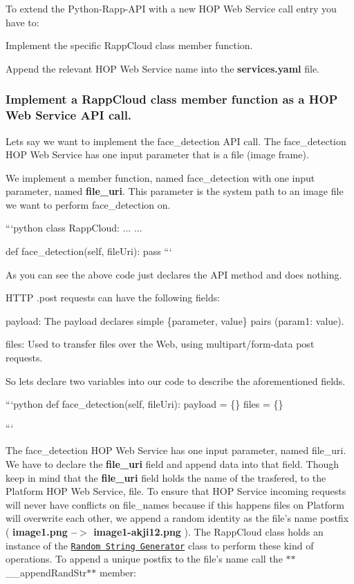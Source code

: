To extend the Python-\/\-Rapp-\/\-A\-P\-I with a new H\-O\-P Web Service call entry you have to\-:


\begin{DoxyItemize}
\item Implement the specific Rapp\-Cloud class member function.
\item Append the relevant H\-O\-P Web Service name into the {\bfseries services.\-yaml} file.
\end{DoxyItemize}

\subsubsection*{Implement a Rapp\-Cloud class member function as a H\-O\-P Web Service A\-P\-I call.}

Lets say we want to implement the face\-\_\-detection A\-P\-I call. The face\-\_\-detection H\-O\-P Web Service has one input parameter that is a file (image frame).

We implement a member function, named face\-\_\-detection with one input parameter, named {\bfseries file\-\_\-uri}. This parameter is the system path to an image file we want to perform face\-\_\-detection on.

```python class Rapp\-Cloud\-: ... ...

def face\-\_\-detection(self, file\-Uri)\-: pass ```

As you can see the above code just declares the A\-P\-I method and does nothing.

H\-T\-T\-P .post requests can have the following fields\-:


\begin{DoxyItemize}
\item payload\-: The payload declares simple \{parameter, value\} pairs (param1\-: value).
\item files\-: Used to transfer files over the Web, using multipart/form-\/data post requests.
\end{DoxyItemize}

So lets declare two variables into our code to describe the aforementioned fields.

```python def face\-\_\-detection(self, file\-Uri)\-: payload = \{\} files = \{\}

```

The face\-\_\-detection H\-O\-P Web Service has one input parameter, named file\-\_\-uri. We have to declare the {\bfseries file\-\_\-uri} field and append data into that field. Though keep in mind that the {\bfseries file\-\_\-uri} field holds the name of the trasfered, to the Platform H\-O\-P Web Service, file. To ensure that H\-O\-P Service incoming requests will never have conflicts on file\-\_\-names because if this happens files on Platform will overwrite each other, we append a random identity as the file's name postfix ( {\bfseries image1.\-png --$>$ image1-\/akji12.\-png} ). The Rapp\-Cloud class holds an instance of the \href{https://github.com/rapp-project/rapp-api/blob/master/python/RappCloud/RandStrGen/RandStrGen.py}{\tt Random String Generator} class to perform these kind of operations. To append a unique postfix to the file's name call the $\ast$$\ast$\-\_\-\-\_\-append\-Rand\-Str$\ast$$\ast$ member\-:

